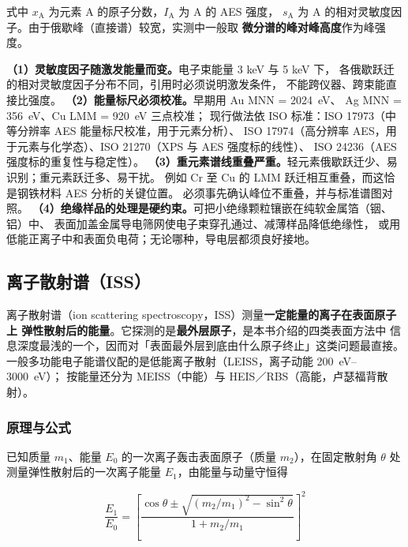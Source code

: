 式中 $x_{\mathrm{A}}$ 为元素 A 的原子分数，$I_{\mathrm{A}}$ 为 A 的 AES 强度，
$s_{\mathrm{A}}$ 为 A 的相对灵敏度因子。由于俄歇峰（直接谱）较宽，实测中一般取
\textbf{微分谱的峰对峰高度}作为峰强度。

\begin{pitfall}
\textbf{（1）灵敏度因子随激发能量而变。}电子束能量 3 keV 与 5 keV 下，
各俄歇跃迁的相对灵敏度因子分布不同，引用时必须说明激发条件，
不能跨仪器、跨束能直接比强度。
\textbf{（2）能量标尺必须校准。}早期用 Au MNN = \qty{2024}{eV}、
Ag MNN = \qty{356}{eV}、Cu LMM = \qty{920}{eV} 三点校准；
现行做法依 ISO 标准：ISO 17973（中等分辨率 AES 能量标尺校准，用于元素分析）、
ISO 17974（高分辨率 AES，用于元素与化学态）、ISO 21270（XPS 与 AES 强度标的线性）、
ISO 24236（AES 强度标的重复性与稳定性）。
\textbf{（3）重元素谱线重叠严重。}轻元素俄歇跃迁少、易识别；重元素跃迁多、易干扰。
例如 Cr 至 Cu 的 LMM 跃迁相互重叠，而这恰是钢铁材料 AES 分析的关键位置。
必须事先确认峰位不重叠，并与标准谱图对照。
\textbf{（4）绝缘样品的处理是硬约束。}可把小绝缘颗粒镶嵌在纯软金属箔（铟、铝）中、
表面加盖金属导电筛网使电子束穿孔通过、减薄样品降低绝缘性，
或用低能正离子中和表面负电荷；无论哪种，导电层都须良好接地。
\end{pitfall}

\subsection{离子散射谱（ISS）}

\begin{probout}
离子散射谱（ion scattering spectroscopy，ISS）测量\textbf{一定能量的离子在表面原子上
弹性散射后的能量}。它探测的是\textbf{最外层原子}，是本书介绍的四类表面方法中
信息深度最浅的一个，因而对「表面最外层到底由什么原子终止」这类问题最直接。
一般多功能电子能谱仪配的是低能离子散射（LEISS，离子动能 \qtyrange{200}{3000}{eV}）；
按能量还分为 MEISS（中能）与 HEIS／RBS（高能，卢瑟福背散射）。
\end{probout}

\subsubsection{原理与公式}

已知质量 $m_1$、能量 $E_0$ 的一次离子轰击表面原子（质量 $m_2$），在固定散射角 $\theta$
处测量弹性散射后的一次离子能量 $E_1$，由能量与动量守恒得

\begin{equation}\label{eq:iss-ch09}
\frac{E_1}{E_0}=\left[\frac{\cos\theta\pm\sqrt{(m_2/m_1)^2-\sin^2\theta}}{1+m_2/m_1}\right]^{2}
\end{equation}

